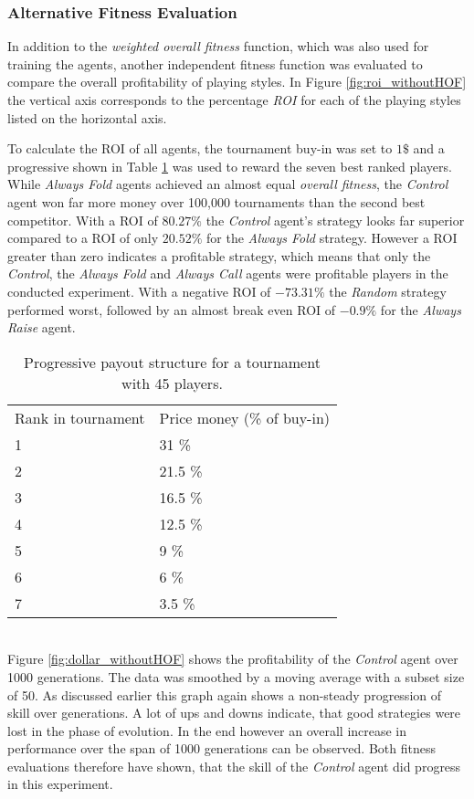\subsubsection{Alternative Fitness Evaluation}
 In addition to the \textit{weighted overall fitness} function, which was also used for training the agents, another independent fitness function was evaluated to compare the overall profitability of playing styles. In Figure \ref{fig:roi_withoutHOF} the vertical axis corresponds to the percentage \textit{ROI} for each of the playing styles listed on the horizontal axis.\par
 To calculate the ROI of all agents, the tournament buy-in was set to $1\$$ and a progressive  shown in Table \ref{tab:payout_structure} was used to reward the seven best ranked players. While \textit{Always Fold} agents achieved an almost equal \textit{overall fitness}, the \textit{Control} agent won far more money over 100,000 tournaments than the second best competitor. With a ROI of $80.27\%$ the \textit{Control} agent's strategy looks far superior compared to a ROI of only $20.52\%$ for the \textit{Always Fold} strategy. However a ROI greater than zero indicates a profitable strategy, which means that only the \textit{Control}, the \textit{Always Fold} and \textit{Always Call} agents were profitable players in the conducted experiment. With a negative ROI of $-73.31\%$ the \textit{Random} strategy performed worst, followed by an almost break even ROI of $-0.9\%$ for the \textit{Always Raise} agent. 
 \begin{table}[]
\begin{tabular}{|l||l|}
\hline
\multicolumn{1}{|c||}{Rank in tournament} & \multicolumn{1}{c|}{Price money (\% of buy-in)} \\ \hhline{=#=}
1 & 31 \% \ \\ \hline
2 & 21.5 \% \ \\ \hline
3 & 16.5 \% \ \\ \hline
4 & 12.5 \% \ \\ \hline
5 & 9 \% \ \\ \hline
6 & 6 \% \ \\ \hline
7 & 3.5 \% \ \\ \hline
\end{tabular}
\centering
\caption{Progressive payout structure for a tournament with 45 players.}
\label{tab:payout_structure}
\end{table} \ \\
Figure \ref{fig:dollar_withoutHOF} shows the profitability of the \textit{Control} agent over 1000 generations. The data was smoothed by a moving average with a subset size of 50. As discussed earlier this graph again shows a non-steady progression of skill over generations. A lot of ups and downs indicate, that good strategies were lost in the phase of evolution. In the end however an overall increase in performance over the span of 1000 generations can be observed. Both fitness evaluations therefore have shown, that the skill of the \textit{Control} agent did progress in this experiment.
